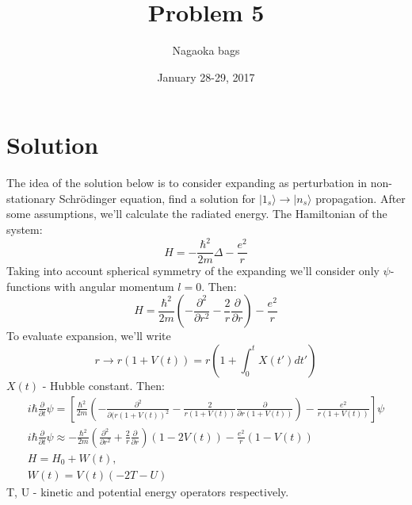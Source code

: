 \documentclass[12pt]{article}
\title{Problem 5}
\author{Nagaoka bags}
\date{January 28-29, 2017}
\begin{document}
\maketitle
\iffalse
\begin{center}
{\large Problem 5 - Expanding Universe} \\ %
\end{center}
\fi
\section{Solution}
The idea of the solution below is to consider expanding as perturbation in non-stationary Schrödinger equation, find a solution for $|1_s\rangle \longrightarrow |n_s\rangle$ propagation. After some assumptions, we'll calculate the radiated energy.
The Hamiltonian of the system:
\begin{equation}
	H = -\frac{\hbar^2}{2m}\Delta - \frac{e^2}{r}	
\end{equation}
Taking into account spherical symmetry of the expanding we'll consider only $\psi$-functions with angular momentum $l=0$.
Then:
\begin{equation}
	H = \frac{\hbar^2}{2m}(-\frac{\partial^2}{\partial r^2} - \frac{2}{r}\frac{\partial}{\partial r}) - \frac{e^2}{r}
\end{equation}
To evaluate expansion, we'll write
\begin{equation}
r \longrightarrow r(1+V(t)) = r(1+ \int_0^t X(t')dt')
\end{equation}
$X(t)$ - Hubble constant. Then:
\begin{eqnarray}
i\hbar \frac {\partial}{\partial t}\psi	=[ \frac{\hbar^2}{2m}(-\frac{\partial^2}{\partial (r(1+V(t))^2} - \frac{2}{r(1+V(t))}\frac{\partial}{\partial r(1+V(t))}) - \frac{e^2}{r(1+V(t))}]\psi \nonumber \\
i\hbar \frac {\partial}{\partial t}\psi	\approx -\frac{\hbar^2}{2m}(\frac{\partial^2}{\partial r^2} + \frac{2}{r}\frac{\partial}{\partial r})(1-2V(t)) - \frac{e^2}{r}(1-V(t)) \nonumber \\
H = H_0 +W(t),\nonumber \\ W(t) = V(t)(-2T - U)
\end{eqnarray}
T, U - kinetic and potential energy operators respectively.
\end{document}
